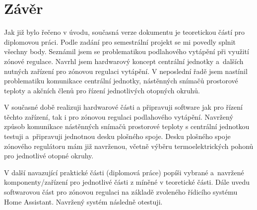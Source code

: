 \chapter{Závěr}
Jak již bylo řečeno v úvodu, současná verze dokumentu je teoretickou částí pro diplomovou práci. Podle zadání pro semestrální projekt se mi povedly splnit všechny body. Seznámil jsem se problematikou podlahového vytápění při využití zónové regulace. Navrhl jsem hardwarový koncept centrální jednotky a~dalších nutných zařízení pro zónovou regulaci vytápění. V  neposlední řadě jsem nastínil problematiku komunikace centrální jednotky, nástěnných snímačů prostorové teploty a akčních členů pro řízení jednotlivých otopných okruhů.

V současné době realizuji hardwarové části a připravuji software jak pro řízení těchto zařízení, tak i pro zónovou regulaci podlahového vytápění. Navržený způsob komunikace nástěnných snímačů prostorové teploty s centrální jednotkou testuji a~připravuji jednotnou desku plošného spoje. Desku plošného spoje zónového regulátoru mám již navrženou, včetně výběru termoelektrických pohonů pro jednotlivé otopné okruhy.

V další navazující praktické části (diplomová práce) popíši vybrané a~navržené komponenty/zařízení pro jednotlivé části z míněné v teoretické části. Dále uvedu softwarovou část pro zónovou regulaci na základě zvoleného řídicího systému Home Assistant. Navržený systém následně otestuji.